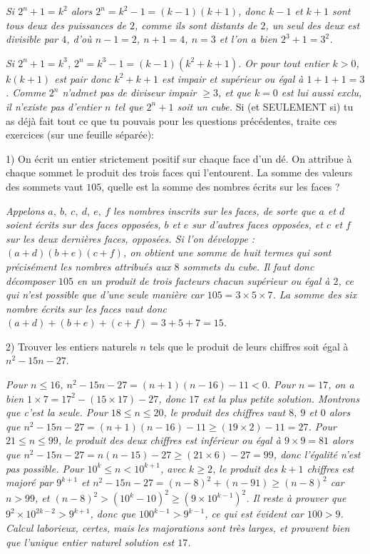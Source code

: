 \bigskip
\emph{Si $2^n+1 = k^2$ alors $2^n = k^2-1 = (k-1)(k+1)$, donc $k-1$ et $k+1$ sont tous deux des puissances de $2$, comme ils sont distants de $2$, un seul des deux est divisible par $4$, d'où $n-1 = 2$, $n+1 = 4$, $n = 3$ et l'on a bien $2^3+1 = 3^2$.}

\emph{Si $2^n+1 = k^3$, $2^n = k^3-1 = (k-1)\left(k^2+k+1\right)$. Or pour tout entier $k > 0$, $k(k+1)$ est pair donc $k^2+k+1$ est impair et supérieur ou égal à $1+1+1 = 3$. Comme $2^n$ n'admet pas de diviseur impair $\geq 3$, et que $k = 0$ est lui aussi exclu, il n'existe pas d'entier $n$ tel que $2^n+1$ soit un cube.}
\ligne
Si (et SEULEMENT si) tu as déjà fait tout ce que tu pouvais pour les questions précédentes, traite ces exercices (sur une feuille séparée):

1) On écrit un entier strictement positif sur chaque face d'un dé. On attribue à chaque sommet le produit des trois faces qui l'entourent. La somme des valeurs des sommets vaut $105$, quelle est la somme des nombres écrits sur les faces ?

\bigskip

\emph{Appelons $a, \ b, \ c, \ d, \ e, \ f$ les nombres inscrits sur les faces, de sorte que $a$ et $d$ soient écrits sur des faces opposées, $b$ et $e$ sur d'autres faces opposées, et $c$ et $f$ sur les deux dernières faces, opposées. Si l'on développe : $(a+d)(b+e)(c+f)$, on obtient une somme de huit termes qui sont précisément les nombres attribués aux $8$ sommets du cube. Il faut donc décomposer $105$ en un produit de trois facteurs chacun supérieur ou égal à $2$, ce qui n'est possible que d'une seule manière car $105 = 3 \times 5 \times 7$. La somme des six nombre écrits sur les faces vaut donc $(a+d)+(b+e)+(c+f) = 3 + 5 + 7 = 15$.}

\bigskip

2) Trouver les entiers naturels $n$ tels que le produit de leurs chiffres soit égal à $n^2-15n-27$.

\bigskip

\emph{Pour $n \leq 16$, $n^2 - 15n - 27 = (n + 1)(n - 16) - 11 < 0$. Pour $n = 17$, on a bien $1 \times 7 = 17^2 - (15 \times 17) - 27$, donc $17$ est la plus petite solution. Montrons que c'est la seule. Pour $18 \leq n \leq 20$, le produit des chiffres vaut $8, \ 9$ et $0$ alors que $n^2 - 15n - 27 = (n+1)(n-16) - 11 \geq (19 \times 2 ) - 11 = 27$. Pour $21 \leq n \leq 99$, le produit des deux chiffres est inférieur ou égal à $9 \times 9 = 81$ alors que $n^2 - 15n -27 = n(n-15) -27 \geq (21 \times 6) - 27 = 99$, donc l'égalité n'est pas possible. Pour $10^k \leq n < 10^{k+1}$, avec $k \geq 2$, le produit des $k+1$ chiffres est majoré par $9^{k+1}$ et $n^2 - 15n - 27 = (n-8)^2 + (n-91) \geq (n-8)^2$ car $n>99$, et $(n-8)^2 > \left(10^k - 10\right)^2 \geq (9 \times 10^{k-1})^2$. Il reste à prouver que $9^2 \times 10^{2k-2} > 9^{k+1}$, donc que $100^{k-1} > 9^{k-1}$, ce qui est évident car $100 > 9$. Calcul laborieux, certes, mais les majorations sont très larges, et prouvent bien que l'unique entier naturel solution est $17$.} 

